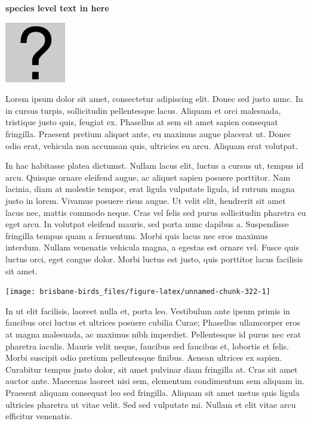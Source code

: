 \documentclass[]{book}
\let\origfigure\figure
\let\endorigfigure\endfigure
\renewenvironment{figure}[1][2] {
  \expandafter\origfigure\expandafter[H]
} {
  \endorigfigure
}
\begin{document}
\textbf{species level text in here}

\begin{figure}
\centering
\includegraphics{assets/missing.png}
\caption{No image for species}
\end{figure}

Lorem ipsum dolor sit amet, consectetur adipiscing elit. Donec sed justo
nunc. In in cursus turpis, sollicitudin pellentesque lacus. Aliquam et
orci malesuada, tristique justo quis, feugiat ex. Phasellus at sem sit
amet sapien consequat fringilla. Praesent pretium aliquet ante, eu
maximus augue placerat ut. Donec odio erat, vehicula non accumsan quis,
ultricies eu arcu. Aliquam erat volutpat.

In hac habitasse platea dictumst. Nullam lacus elit, luctus a cursus ut,
tempus id arcu. Quisque ornare eleifend augue, ac aliquet sapien posuere
porttitor. Nam lacinia, diam at molestie tempor, erat ligula vulputate
ligula, id rutrum magna justo in lorem. Vivamus posuere risus augue. Ut
velit elit, hendrerit sit amet lacus nec, mattis commodo neque. Cras vel
felis sed purus sollicitudin pharetra eu eget arcu. In volutpat eleifend
mauris, sed porta nunc dapibus a. Suspendisse fringilla tempus quam a
fermentum. Morbi quis lacus nec eros maximus interdum. Nullam venenatis
vehicula magna, a egestas est ornare vel. Fusce quis luctus orci, eget
congue dolor. Morbi luctus est justo, quis porttitor lacus facilisis sit
amet.

\begin{figure}
\texttt{[image: brisbane-birds\_files/figure-latex/unnamed-chunk-322-1]} \caption{insert figure caption}\label{fig:unnamed-chunk-322}
\end{figure}

In ut elit facilisis, laoreet nulla et, porta leo. Vestibulum ante ipsum
primis in faucibus orci luctus et ultrices posuere cubilia Curae;
Phasellus ullamcorper eros at magna malesuada, ac maximus nibh
imperdiet. Pellentesque id purus nec erat pharetra iaculis. Mauris velit
neque, faucibus sed faucibus et, lobortis et felis. Morbi suscipit odio
pretium pellentesque finibus. Aenean ultrices ex sapien. Curabitur
tempus justo dolor, sit amet pulvinar diam fringilla at. Cras sit amet
auctor ante. Maecenas laoreet nisi sem, elementum condimentum sem
aliquam in. Praesent aliquam consequat leo sed fringilla. Aliquam sit
amet metus quis ligula ultricies pharetra ut vitae velit. Sed sed
vulputate mi. Nullam et elit vitae arcu efficitur venenatis.
\end{document}
